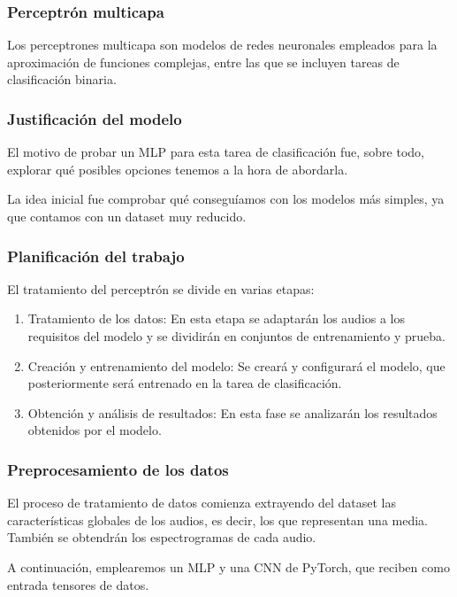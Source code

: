 \subsubsection{Perceptrón multicapa}

Los perceptrones multicapa son modelos de redes neuronales empleados para la aproximación de funciones complejas, entre las que se incluyen tareas de clasificación binaria.

\subsubsection*{Justificación del modelo}

El motivo de probar un MLP para esta tarea de clasificación fue, sobre todo, explorar qué posibles opciones tenemos a la hora de abordarla.

La idea inicial fue comprobar qué conseguíamos con los modelos más simples, ya que contamos con un dataset muy reducido.

\subsubsection*{Planificación del trabajo}

El tratamiento del perceptrón se divide en varias etapas:

\begin{enumerate}
 \item Tratamiento de los datos: En esta etapa se adaptarán los audios a los requisitos del modelo y se dividirán en conjuntos de entrenamiento y prueba.
 \item Creación y entrenamiento del modelo: Se creará y configurará el modelo, que posteriormente será entrenado en la tarea de clasificación.
 \item Obtención y análisis de resultados: En esta fase se analizarán los resultados obtenidos por el modelo.
\end{enumerate}

\subsubsection*{Preprocesamiento de los datos}

El proceso de tratamiento de datos comienza extrayendo del dataset las características globales de los audios, es decir, los que representan una media. También se obtendrán los espectrogramas de cada audio.

A continuación, emplearemos un MLP y una CNN de PyTorch, que reciben como entrada tensores de datos.

